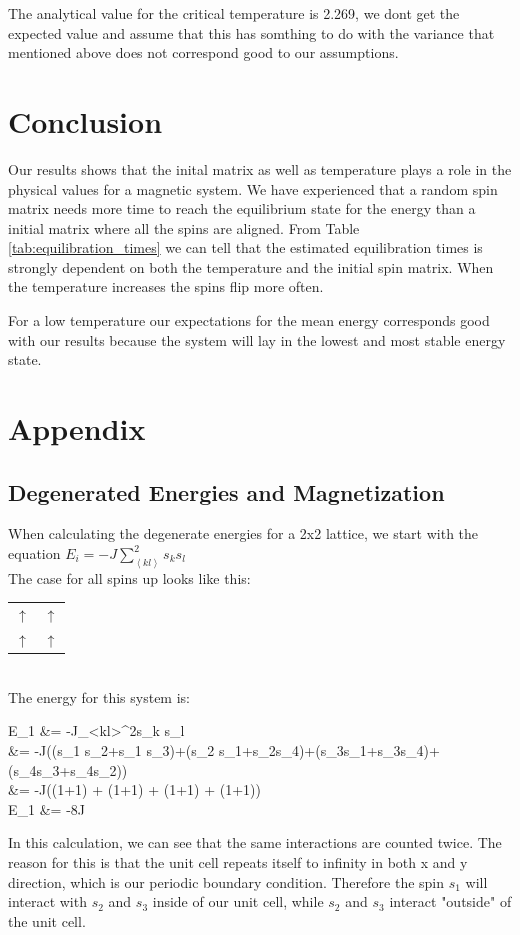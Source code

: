 \documentclass{article}
\begin{document}
{{{	The analytical value for the critical temperature is 2.269, we dont get the expected value and assume that this has somthing to do with the variance that mentioned above does not correspond good to our assumptions. 

\section{Conclusion}
Our results shows that the inital matrix as well as temperature plays a role in the physical values for a magnetic system. We have experienced that a random spin matrix needs more time to reach the equilibrium state for the energy than a initial matrix where all the spins are aligned. From Table \ref{tab:equilibration_times} we can tell that the estimated equilibration times is strongly dependent on both the temperature and the initial spin matrix. When the temperature increases the spins flip more often.

For a low temperature our expectations for the mean energy corresponds good with our results because the system will lay in the lowest and most stable energy state.


\section{Appendix}
	\subsection{Degenerated Energies and Magnetization}

		When calculating the degenerate energies for a 2x2 lattice, we start with the equation $E_i=-J\sum\limits_{\left<kl\right>}^{2}s_ks_l$\\
		The case for all spins up looks like this:
		\begin{tabular}{c c}
			$\uparrow$ & $\uparrow$\\
			$\uparrow$ & $\uparrow$
		\end{tabular}\\

		The energy for this system is:
		\begin{flalign*}
			E_1 &= -J\sum\limits_{<kl>}^{2}s_k s_l\\
			&= -J((s_1 s_2+s_1 s_3)+(s_2 s_1+s_2s_4)+(s_3s_1+s_3s_4)+(s_4s_3+s_4s_2))\\
			&= -J((1+1) + (1+1) + (1+1) + (1+1))\\
			E_1 &= -8J
		\end{flalign*}
		In this calculation, we can see that the same interactions are counted twice. The reason for this is that the unit cell repeats itself to infinity in both x and y direction, which is our periodic boundary condition. Therefore the spin $s_1$ will interact with $s_2$ and $s_3$ inside of our unit cell, while $s_2$ and $s_3$ interact "outside" of the unit cell.

}}}
\end{document}
